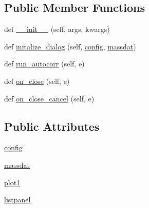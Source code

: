 \subsection*{Public Member Functions}
\begin{DoxyCompactItemize}
\item 
def \hyperlink{class_uni_dec_1_1unidec__modules_1_1_autocorr_window_1_1_autocorr_window_ade5e97f587499a851581c33344ebe9cb}{\+\_\+\+\_\+init\+\_\+\+\_\+} (self, args, kwargs)
\item 
def \hyperlink{class_uni_dec_1_1unidec__modules_1_1_autocorr_window_1_1_autocorr_window_a23fb9762a69bfaa2f0652efa6b23ecdd}{initalize\+\_\+dialog} (self, \hyperlink{class_uni_dec_1_1unidec__modules_1_1_autocorr_window_1_1_autocorr_window_aef5b3c696975039f81123011e9893a44}{config}, \hyperlink{class_uni_dec_1_1unidec__modules_1_1_autocorr_window_1_1_autocorr_window_a67da093c3a81bf1a201afdd62fbda966}{massdat})
\item 
def \hyperlink{class_uni_dec_1_1unidec__modules_1_1_autocorr_window_1_1_autocorr_window_ae0872d67324dca3a70bb58d86f77ac3e}{run\+\_\+autocorr} (self, e)
\item 
def \hyperlink{class_uni_dec_1_1unidec__modules_1_1_autocorr_window_1_1_autocorr_window_a2d54318f2246b6f3b7ef57984dfe19f6}{on\+\_\+close} (self, e)
\item 
def \hyperlink{class_uni_dec_1_1unidec__modules_1_1_autocorr_window_1_1_autocorr_window_a224e86a6d1d01df796b307414ce6bd1e}{on\+\_\+close\+\_\+cancel} (self, e)
\end{DoxyCompactItemize}
\subsection*{Public Attributes}
\begin{DoxyCompactItemize}
\item 
\hyperlink{class_uni_dec_1_1unidec__modules_1_1_autocorr_window_1_1_autocorr_window_aef5b3c696975039f81123011e9893a44}{config}
\item 
\hyperlink{class_uni_dec_1_1unidec__modules_1_1_autocorr_window_1_1_autocorr_window_a67da093c3a81bf1a201afdd62fbda966}{massdat}
\item 
\hyperlink{class_uni_dec_1_1unidec__modules_1_1_autocorr_window_1_1_autocorr_window_a289a385211c513dcbd32329fb2ba992e}{plot1}
\item 
\hyperlink{class_uni_dec_1_1unidec__modules_1_1_autocorr_window_1_1_autocorr_window_af1052323de216dc047084e42475f562b}{listpanel}
\end{DoxyCompactItemize}


